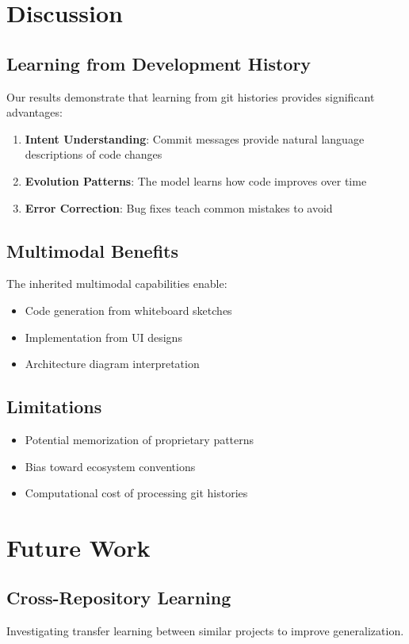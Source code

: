 \documentclass[11pt,a4paper]{article}
\begin{document}
\section{Discussion}

\subsection{Learning from Development History}
Our results demonstrate that learning from git histories provides significant advantages:
\begin{enumerate}
    \item \textbf{Intent Understanding}: Commit messages provide natural language descriptions of code changes
    \item \textbf{Evolution Patterns}: The model learns how code improves over time
    \item \textbf{Error Correction}: Bug fixes teach common mistakes to avoid
\end{enumerate}

\subsection{Multimodal Benefits}
The inherited multimodal capabilities enable:
\begin{itemize}
    \item Code generation from whiteboard sketches
    \item Implementation from UI designs
    \item Architecture diagram interpretation
\end{itemize}

\subsection{Limitations}
\begin{itemize}
    \item Potential memorization of proprietary patterns
    \item Bias toward ecosystem conventions
    \item Computational cost of processing git histories
\end{itemize}

\section{Future Work}

\subsection{Cross-Repository Learning}
Investigating transfer learning between similar projects to improve generalization.
\end{document}
